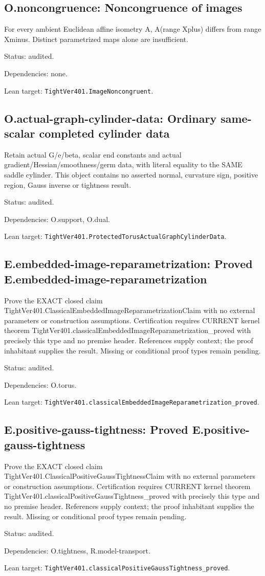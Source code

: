 \documentclass{article}
\begin{document}
\subsection*{O.noncongruence: Noncongruence of images}
For every ambient Euclidean affine isometry A, A(range Xplus) differs from range Xminus. Distinct parametrized maps alone are insufficient.
\par Status: audited.
\par Dependencies: none.
\par Lean target: \texttt{TightVer401.ImageNoncongruent}.
\subsection*{O.actual-graph-cylinder-data: Ordinary same-scalar completed cylinder data}
Retain actual G/e/beta, scalar end constants and actual gradient/Hessian/smoothness/germ data, with literal equality to the SAME saddle cylinder. This object contains no asserted normal, curvature sign, positive region, Gauss inverse or tightness result.
\par Status: audited.
\par Dependencies: O.support, O.dual.
\par Lean target: \texttt{TightVer401.ProtectedTorusActualGraphCylinderData}.
\subsection*{E.embedded-image-reparametrization: Proved E.embedded-image-reparametrization}
Prove the EXACT closed claim TightVer401.ClassicalEmbeddedImageReparametrizationClaim with no external parameters or construction assumptions. Certification requires CURRENT kernel theorem TightVer401.classicalEmbeddedImageReparametrization\_proved with precisely this type and no premise header. References supply context; the proof inhabitant supplies the result. Missing or conditional proof types remain pending.
\par Status: audited.
\par Dependencies: O.torus.
\par Lean target: \texttt{TightVer401.classicalEmbeddedImageReparametrization\_proved}.
\subsection*{E.positive-gauss-tightness: Proved E.positive-gauss-tightness}
Prove the EXACT closed claim TightVer401.ClassicalPositiveGaussTightnessClaim with no external parameters or construction assumptions. Certification requires CURRENT kernel theorem TightVer401.classicalPositiveGaussTightness\_proved with precisely this type and no premise header. References supply context; the proof inhabitant supplies the result. Missing or conditional proof types remain pending.
\par Status: audited.
\par Dependencies: O.tightness, R.model-transport.
\par Lean target: \texttt{TightVer401.classicalPositiveGaussTightness\_proved}.
\end{document}
